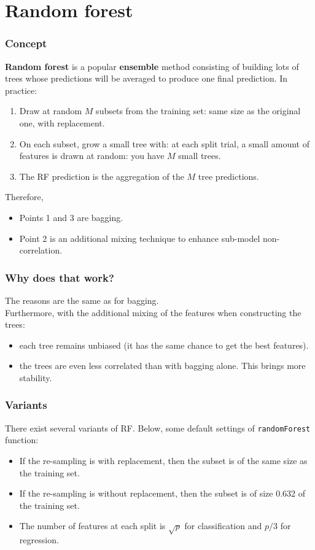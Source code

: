 \section{Random forest}
\begin{frame}
\frametitle{Concept}
{\bf Random forest} is a popular {\bf ensemble} method consisting of building lots of trees whose predictions will be averaged to produce one final prediction. In practice:
\begin{enumerate}
\item Draw at random $M$ subsets from the training set: same size as the original one, with replacement.
\item On each subset, grow a small tree with: at each split trial, a small amount of features is drawn at random: you have $M$ small trees.
\item The RF prediction is the aggregation of the $M$ tree predictions.\\
\end{enumerate}
Therefore, \\
\begin{itemize}
\item Points 1 and 3 are bagging.
\item Point 2 is an additional mixing technique to enhance sub-model non-correlation.
\end{itemize}
\end{frame}
\begin{frame}
\frametitle{Why does that work?}
The reasons are the same as for bagging.\\
\vspace{0.3cm}
Furthermore, with the additional mixing of the features when constructing the trees:
\begin{itemize}
\item each tree remains unbiased (it has the same chance to get the best features).
\item the trees are even less correlated than with bagging alone. This brings more stability.
\end{itemize}
\end{frame}
\begin{frame}
\frametitle{Variants}
There exist several variants of RF. Below, some default settings of {\tt randomForest} function:
\begin{itemize}
\item If the re-sampling is with replacement, then the subset is of the same size as the training set.
\item If the re-sampling is without replacement, then the subset is of size 0.632 of the training set.
\item The number of features at each split is $\sqrt{p}$ for classification and $p/3$ for regression.
\end{itemize}
\end{frame}
